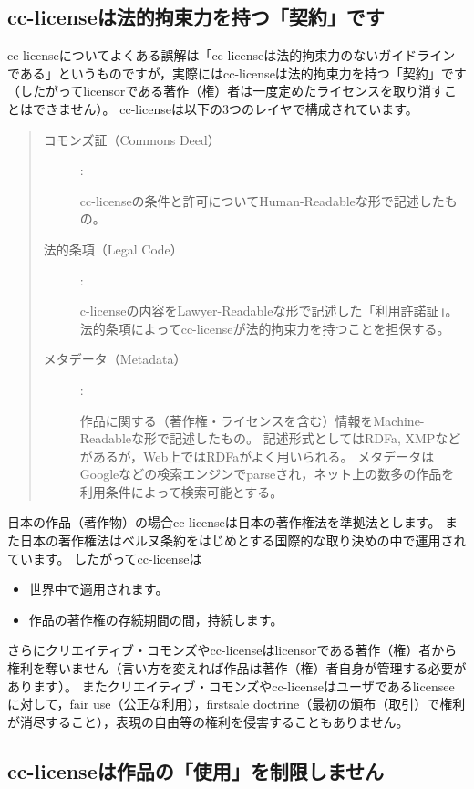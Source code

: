 \documentclass{ltjsarticle}
\begin{document}
\subsection{cc-licenseは法的拘束力を持つ「契約」です}

cc-licenseについてよくある誤解は「cc-licenseは法的拘束力のないガイドラインである」というものですが，実際にはcc-licenseは法的拘束力を持つ「契約」です（したがってlicensorである著作（権）者は一度定めたライセンスを取り消すことはできません）。
cc-licenseは以下の3つのレイヤで構成されています。
\begin{quote}\begin{description}
\item[コモンズ証（Commons Deed）] :\par
    cc-licenseの条件と許可についてHuman-Readableな形で記述したもの。
\item[法的条項（Legal Code）] :\par
    c-licenseの内容をLawyer-Readableな形で記述した「利用許諾証」。
    法的条項によってcc-licenseが法的拘束力を持つことを担保する。
\item[メタデータ（Metadata）] :\par
    作品に関する（著作権・ライセンスを含む）情報をMachine-Readableな形で記述したもの。
    記述形式としてはRDFa, XMPなどがあるが，Web上ではRDFaがよく用いられる。
    メタデータはGoogleなどの検索エンジンでparseされ，ネット上の数多の作品を利用条件によって検索可能とする。
\end{description}\end{quote}

日本の作品（著作物）の場合cc-licenseは日本の著作権法を準拠法とします。
また日本の著作権法はベルヌ条約をはじめとする国際的な取り決めの中で運用されています。
したがってcc-licenseは
\begin{itemize}
\item 世界中で適用されます。
\item 作品の著作権の存続期間の間，持続します。
\end{itemize}
さらにクリエイティブ・コモンズやcc-licenseはlicensorである著作（権）者から権利を奪いません（言い方を変えれば作品は著作（権）者自身が管理する必要があります）。
またクリエイティブ・コモンズやcc-licenseはユーザであるlicenseeに対して，fair use（公正な利用），firstsale doctrine（最初の頒布（取引）で権利が消尽すること），表現の自由等の権利を侵害することもありません。


\subsection{cc-licenseは作品の「使用」を制限しません}
\end{document}
